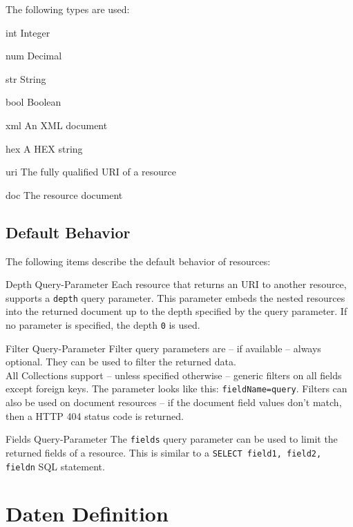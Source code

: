 \documentclass[10pt,a4paper]{scrartcl}
\begin{document}
The following types are used:

\begin{description*}
	\item[int] Integer
	\item[num] Decimal
	\item[str] String
	\item[bool] Boolean
	\item[xml] An XML document
	\item[hex] A HEX string
	\item[uri] The fully qualified URI of a resource
	\item[doc] The resource document
\end{description*}

\subsection{Default Behavior}

The following items describe the default behavior of resources:

\begin{description*}
	\item[Depth Query-Parameter] Each resource that returns an URI to another
		resource, supports a \texttt{depth} query parameter. This parameter embeds
		the nested resources into the returned document up to the depth specified by
		the query parameter. If no parameter is specified, the depth \texttt{0} is
		used.
	
	\item[Filter Query-Parameter] Filter query parameters are -- if available --
		always optional. They can be used to filter the returned data.\\
	All Collections support -- unless specified otherwise -- generic filters on
	all fields except foreign keys. The parameter looks like this:
	\texttt{fieldName=query}. Filters can also be used on document resources -- if
	the document field values don't match, then a HTTP 404 status code is
	returned.

	\item[Fields Query-Parameter] The \texttt{fields} query parameter can be used
		to limit the returned fields of a resource. This is similar to a
		\texttt{SELECT field1, field2, fieldn} SQL statement.
	
\end{description*}
 
 
\pagebreak


\section{Daten Definition}
\end{document}
